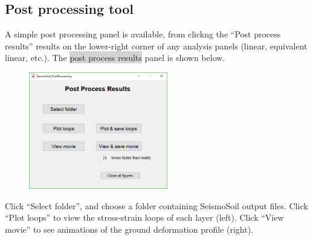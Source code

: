 \documentclass[11pt,letterpaper]{article}
\newcommand{\panel}[1]{\colorbox{lightgray}{\textsf{#1}}}
\begin{document}
\newpage
\subsection{Post processing tool}
A simple post processing panel is available, from clickng the ``\textsf{Post process results}'' results on the lower-right corner of any analysis panels (linear, equivalent linear, etc.). The \panel{post process results} panel is shown below.

\begin{figure}[H]
	\centering
	\includegraphics[width=0.54\textwidth]{PostProcessing.png}\\
\end{figure}

Click ``\textsf{Select folder}'', and choose a folder containing SeismoSoil output files. Click ``\textsf{Plot loops}'' to view the stress-strain loops of each layer (left). Click ``\textsf{View movie}'' to see animations of the ground deformation profile (right).

\begin{figure}[H]
	\centering
\end{figure}
\end{document}
